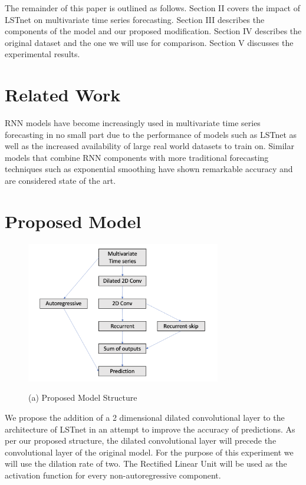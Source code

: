 \documentclass{article}
\begin{document}
The remainder of this paper is outlined as follows. Section II covers the impact of LSTnet on multivariate time series forecasting. Section III describes the components of the model and our proposed modification. Section IV describes the original dataset and the one we will use for comparison. Section V discusses the experimental results. 

\section{Related Work}
RNN models have become increasingly used in multivariate time series forecasting in no small part due to the performance of models such as LSTnet as well as the increased availability of large real world datasets to train on\cite{hewamalage2021recurrent}.  Similar models that combine RNN components with more traditional forecasting techniques such as exponential smoothing\cite{smyl2020hybrid} have shown remarkable accuracy and are considered state of the art.

\section{Proposed Model}
\begin{figure}[htb]
	
	\begin{minipage}[b]{1.0\linewidth}
		\centering
		\centerline{\includegraphics[width=8.5cm]{model_struct}}
		\centerline{(a) Proposed Model Structure}\medskip
	\end{minipage}
\end{figure}
We propose the addition of a 2 dimensional dilated convolutional layer to the architecture of LSTnet in an attempt to improve the accuracy of predictions. As per our proposed structure, the dilated convolutional layer will precede the convolutional layer of the original model. For the purpose of this experiment we will use the dilation rate of two. The Rectified Linear Unit will be used as the activation function for every non-autoregressive component.
\end{document}
